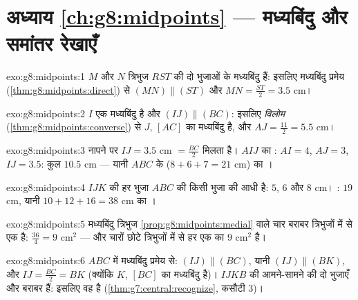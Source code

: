 \section*{अध्याय \ref{ch:g8:midpoints} --- मध्यबिंदु और समांतर रेखाएँ}

\begin{solution}{exo:g8:midpoints:1}
$M$ और $N$ त्रिभुज $RST$ की दो भुजाओं के मध्यबिंदु हैं: इसलिए
मध्यबिंदु प्रमेय (\cref{thm:g8:midpoints:direct}) से
$(MN) \parallel (ST)$ और $MN = \frac{ST}{2} = 3.5$ cm।
\end{solution}

\begin{solution}{exo:g8:midpoints:2}
$I$ एक मध्यबिंदु है और $(IJ) \parallel (BC)$: इसलिए \emph{विलोम}
(\cref{thm:g8:midpoints:converse}) से $J$, $[AC]$ का मध्यबिंदु है,
और $AJ = \frac{11}{2} = 5.5$ cm।
\end{solution}

\begin{solution}{exo:g8:midpoints:3}
नापने पर $IJ = 3.5$ cm $= \frac{BC}{2}$ मिलता है। $AIJ$ का :
$AI = 4$, $AJ = 3$, $IJ = 3.5$: कुल $10.5$ cm --- यानी $ABC$ के
 ($8 + 6 + 7 = 21$ cm) का ।
\end{solution}

\begin{solution}{exo:g8:midpoints:4}
$IJK$ की हर भुजा $ABC$ की किसी भुजा की आधी है: $5$, $6$ और $8$ cm।
: $19$ cm, यानी $10 + 12 + 16 = 38$ cm का ।
\end{solution}

\begin{solution}{exo:g8:midpoints:5}
मध्यबिंदु त्रिभुज \cref{prop:g8:midpoints:medial} वाले चार बराबर
त्रिभुजों में से एक है:  $\frac{36}{4} = 9$ cm$^2$ ---
और चारों छोटे त्रिभुजों में से हर एक का  $9$ cm$^2$ है।
\end{solution}

\begin{solution}{exo:g8:midpoints:6}
$ABC$ में मध्यबिंदु प्रमेय से: $(IJ) \parallel (BC)$, यानी
$(IJ) \parallel (BK)$, और $IJ = \frac{BC}{2} = BK$ (क्योंकि $K$,
$[BC]$ का मध्यबिंदु है)। $IJKB$ की आमने-सामने की दो भुजाएँ 
और बराबर हैं: इसलिए वह  है
(\cref{thm:g7:central:recognize}, कसौटी 3)।
\end{solution}

